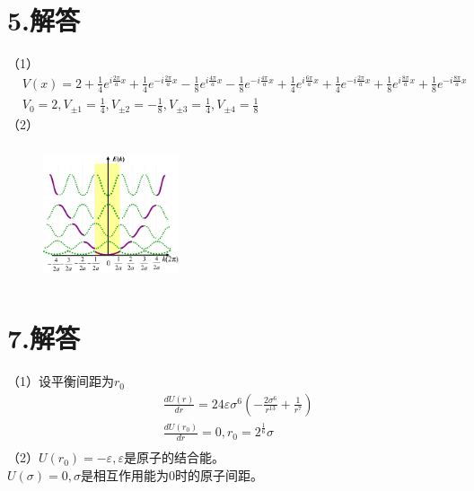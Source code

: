 \documentclass[UTF8]{ctexart}
\begin{document}
\section*{5.解答}
（1）
\begin{equation*}
    \begin{aligned}
        & V(x)=2+\frac{1}{4}e^{i\frac{2\pi}{a}x}+\frac{1}{4}e^{-i\frac{2\pi}{a}x}-\frac{1}{8}e^{i\frac{4\pi}{a}x}
        -\frac{1}{8}e^{-i\frac{4\pi}{a}x}+\frac{1}{4}e^{i\frac{6\pi}{a}x}+\frac{1}{4}e^{-i\frac{2\pi}{a}x}
        +\frac{1}{8}e^{i\frac{8\pi}{a}x}+\frac{1}{8}e^{-i\frac{8\pi}{a}x}\\
        & V_0 = 2, V_{\pm1}=\frac{1}{4}, V_{\pm2}=-\frac{1}{8}, V_{\pm3}=\frac{1}{4}, V_{\pm4}=\frac{1}{8}
    \end{aligned}
\end{equation*}
（2）
\begin{figure}[H]
    \centering
    \includegraphics[width=4cm,height=4cm]{5.png}
\end{figure}
\section*{\bfseries 7.解答}
（1）设平衡间距为$r_0$
\begin{equation*}
    \begin{aligned}
        & \frac{dU(r)}{dr}=24\varepsilon\sigma^6(-\frac{2\sigma^6}{r^{13}}+\frac{1}{r^7})\\
        & \frac{dU(r_0)}{dr}=0, r_0=2^{\frac{1}{6}}\sigma\\
    \end{aligned}
\end{equation*}
（2）$U(r_0)=-\varepsilon,\varepsilon$是原子的结合能。\\
$U(\sigma)=0,\sigma$是相互作用能为0时的原子间距。\\
\end{document}
